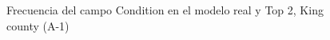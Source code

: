 \begin{figure}[H]
    \centering
    
    \caption{Frecuencia del campo Condition en el modelo real y Top 2, King county (A-1)}
    \label{frecuency-top2-condition}
\end{figure}